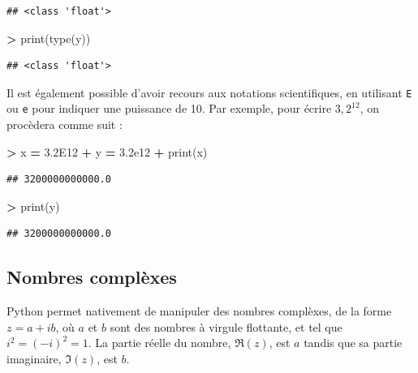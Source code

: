 \documentclass[12pt,]{book}
\newenvironment{Shaded}{\begin{snugshade}}{\end{snugshade}}
\newcommand{\FloatTok}[1]{\textcolor[rgb]{0.00,0.00,0.81}{#1}}
\newcommand{\OperatorTok}[1]{\textcolor[rgb]{0.81,0.36,0.00}{\textbf{#1}}}
\newcommand{\BuiltInTok}[1]{#1}
\newcommand{\NormalTok}[1]{#1}
\numberwithin{equation}{section}
\numberwithin{countremarque}{section}
\begin{document}
\begin{lstlisting}
## <class 'float'>
\end{lstlisting}

\begin{Shaded}
\begin{Highlighting}[]
\OperatorTok{>} \BuiltInTok{print}\NormalTok{(}\BuiltInTok{type}\NormalTok{(y))}
\end{Highlighting}
\end{Shaded}

\begin{lstlisting}
## <class 'float'>
\end{lstlisting}

Il est également possible d'avoir recours aux notations scientifiques,
en utilisant \texttt{E} ou \texttt{e} pour indiquer une puissance de 10.
Par exemple, pour écrire \(3,2^12\), on procèdera comme suit :

\begin{Shaded}
\begin{Highlighting}[]
\OperatorTok{>}\NormalTok{ x }\OperatorTok{=} \FloatTok{3.2E12}
\OperatorTok{+}\NormalTok{ y }\OperatorTok{=} \FloatTok{3.2e12}
\OperatorTok{+} \BuiltInTok{print}\NormalTok{(x)}
\end{Highlighting}
\end{Shaded}

\begin{lstlisting}
## 3200000000000.0
\end{lstlisting}

\begin{Shaded}
\begin{Highlighting}[]
\OperatorTok{>} \BuiltInTok{print}\NormalTok{(y)}
\end{Highlighting}
\end{Shaded}

\begin{lstlisting}
## 3200000000000.0
\end{lstlisting}

\subsection{Nombres complèxes}\label{nombres-complexes}

Python permet nativement de manipuler des nombres complèxes, de la forme
\(z=a+ib\), où \(a\) et \(b\) sont des nombres à virgule flottante, et
tel que \(i^2=(-i)^2=1\). La partie réelle du nombre,
\(\mathfrak{R}(z)\), est \(a\) tandis que sa partie imaginaire,
\(\mathfrak{I}(z)\), est \(b\).
\end{document}

